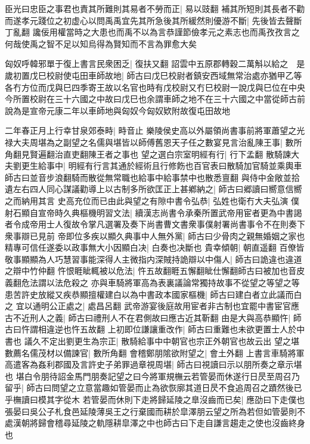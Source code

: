 臣光曰忠臣之事君也責其所難則其易者不勞而正|{
	易以豉翻}
補其所短則其長者不勸而遂孝元踐位之初虚心以問禹禹宜先其所急後其所緩然則優游不斷|{
	先後皆去聲斷丁亂翻}
讒佞用權當時之大患也而禹不以為言恭謹節儉孝元之素志也而禹孜孜言之何哉使禹之智不足以知烏得為賢知而不言為罪愈大矣

匈奴呼韓邪單于復上書言民衆困乏|{
	復扶又翻}
詔雲中五原郡轉穀二萬斛以給之　是歲初置戊巳校尉使屯田車師故地|{
	師古曰戊巳校尉者鎮安西域無常治處亦猶甲乙等各冇方位而戊與巳四季寄王故以名官也時有戊校尉又冇巳校尉一說戊與巳位在中央今所置校尉在三十六國之中故曰戊巳也余謂車師之地不在三十六國之中當從師古前說為是宣帝元康二年以車師地與匈奴今匈奴欵附故復屯田故地}


二年春正月上行幸甘泉郊泰畤|{
	畤音止}
樂陵侯史高以外屬領尚書事前將軍蕭望之光禄大夫周堪為之副望之名儒與堪皆以師傅舊恩天子任之數宴見言治亂陳王事|{
	數所角翻見賢遍翻治直吏翻陳王者之事也}
望之選白宗室明經有行|{
	行下孟翻}
散騎諫大夫劉更生給事中|{
	明經有行言其通於經術且行修飭也百官表曰散騎加官騎並乘輿車師古曰並音步浪翻騎而散從無常職也給事中給事禁中也散悉亶翻}
與侍中金敞並拾遺左右四人同心謀議勸導上以古制多所欲匡正上甚鄕納之|{
	師古曰郷讀曰嚮意信嚮之而納用其言}
史高充位而已由此與望之有隙中書令弘恭|{
	弘姓也衛冇大夫弘演}
僕射石顯自宣帝時久典樞機明習文法|{
	續漢志尚書令承秦所置武帝用宦者更為中書謁者令成帝用士人復故令掌凡選署及奏下尚書曹文書衆事僕射署尚書事令不在則奏下衆事辯已見前}
帝即位多疾以顯久典事中人無外黨|{
	師古曰少骨肉之親無婚姻之家也}
精專可信任遂委以政事無大小因顯白决|{
	白奏也决斷也}
貴幸傾朝|{
	朝直遥翻}
百僚皆敬事顯顯為人巧慧習事能深得人主微指内深賊持詭辯以中傷人|{
	師古曰詭違也違道之辯中竹仲翻}
忤恨睚眦輒被以危法|{
	忤五故翻睚五懈翻眦仕懈翻師古曰被加也音皮義翻危法謂以法危殺之}
亦與車騎將軍高為表裏議論常獨持故事不從望之等望之等患苦許史放縱又疾恭顯擅權建白以為中書政本國家樞機|{
	師古曰建白者立此議而白之}
宜以通明公正處之|{
	處昌呂翻}
武帝游宴後庭故用宦者非古制也宜罷中書宦官應古不近刑人之義|{
	師古曰禮刑人不在君側故曰應古近其靳翻}
由是大與高恭顯忤|{
	師古曰忤謂相違逆也忤五故翻}
上初即位謙讓重改作|{
	師古曰重難也未欲更置士人於中書也}
議久不定出劉更生為宗正|{
	散騎給事中中朝官也宗正外朝官也故云出}
望之堪數薦名儒茂材以備諫官|{
	數所角翻}
會稽鄭朋隂欲附望之|{
	會土外翻}
上書言車騎將軍高遣客為姦利郡國及言許史子弟罪過章視周堪|{
	師古曰視讀曰示以朋所奏之章示堪也}
堪白令朋待詔金馬門朋奏記望之曰今將軍規橅云若管晏而休遂行日昃至周召乃留乎|{
	師古曰問望之立意當趣如管晏而止為欲恢廓其道日昃不食追周召之蹟然後已乎橅讀曰模其字從木}
若管晏而休則下走將歸延陵之臯沒齒而已矣|{
	應劭曰下走僕也張晏曰吳公子札食邑延陵薄吳王之行棄國而耕於皐澤朋云望之所為若但如管晏則不處漢朝將歸會稽尋延陵之軌隱耕皐澤之中也師古曰下走自謙言趨走之使也沒齒終身也}
